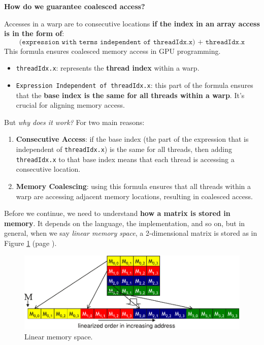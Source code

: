 \begin{flushleft}
    \textcolor{Green3}{ \textbf{How do we guarantee coalesced access?}}
\end{flushleft}
Accesses in a warp are to consecutive locations \textbf{if the index in an array access is in the form of}:
\begin{equation}
    \texttt{(expression with terms independent of threadIdx.x) + threadIdx.x}
\end{equation}
This formula ensures coalesced memory access in GPU programming.
\begin{itemize}
    \item \texttt{threadIdx.x}: represents the \textbf{thread index} within a warp.

    \item \texttt{Expression Independent of threadIdx.x}: this part of the formula ensures that the \textbf{base index is the same for all threads within a warp}. It's crucial for aligning memory access.
\end{itemize}
But \emph{why does it work?} For two main reasons:
\begin{enumerate}
    \item \textbf{Consecutive Access}: if the base index (the part of the expression that is independent of \texttt{threadIdx.x}) is the same for all threads, then adding \texttt{threadIdx.x} to that base index means that each thread is accessing a consecutive location.

    \item \textbf{Memory Coalescing}: using this formula ensures that all threads within a warp are accessing adjacent memory locations, resulting in coalesced access.
\end{enumerate}

\highspace
Before we continue, we need to understand \textbf{how a matrix is stored in memory}. It depends on the language, the implementation, and so on, but in general, when we say \emph{linear memory space}, a 2-dimensional matrix is stored as in Figure \ref{fig: linear memory space} (page \pageref{fig: linear memory space}).

\newpage

\begin{figure}[!htp]
    \centering
    \includegraphics[width=.9\textwidth]{img/cuda-linear-memory-space-1.pdf}
    \caption{Linear memory space.}
    \label{fig: linear memory space}
\end{figure}

